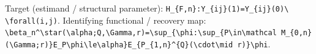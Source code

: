 \documentclass{article}
\begin{document}
Target (estimand / structural parameter): \texttt{H\_\allowbreak{}\{F,\allowbreak{}n\}\allowbreak{}:\allowbreak{}Y\_\allowbreak{}\{ij\}\allowbreak{}(1)=\allowbreak{}Y\_\allowbreak{}\{ij\}\allowbreak{}(0)\textbackslash{}\allowbreak{} \textbackslash{}\allowbreak{}forall(i,\allowbreak{}j)}.
Identifying functional / recovery map: \texttt{\textbackslash{}\allowbreak{}beta\_\allowbreak{}n\textasciicircum{}\textbackslash{}\allowbreak{}star(\textbackslash{}\allowbreak{}alpha;\allowbreak{}Q,\allowbreak{}\textbackslash{}\allowbreak{}Gamma,\allowbreak{}r)=\allowbreak{}\textbackslash{}\allowbreak{}sup\_\allowbreak{}\{\textbackslash{}\allowbreak{}phi:\allowbreak{}\textbackslash{}\allowbreak{}sup\_\allowbreak{}\{P\textbackslash{}\allowbreak{}in\textbackslash{}\allowbreak{}mathcal M\_\allowbreak{}\{0,\allowbreak{}n\}\allowbreak{}(\textbackslash{}\allowbreak{}Gamma;\allowbreak{}r)\}\allowbreak{}E\_\allowbreak{}P\textbackslash{}\allowbreak{}phi\textbackslash{}\allowbreak{}le\textbackslash{}\allowbreak{}alpha\}\allowbreak{}E\_\allowbreak{}\{P\_\allowbreak{}\{1,\allowbreak{}n\}\allowbreak{}\textasciicircum{}\{Q\}\allowbreak{}(\textbackslash{}\allowbreak{}cdot\textbackslash{}\allowbreak{}mid r)\}\allowbreak{}\textbackslash{}\allowbreak{}phi}.
\end{document}
